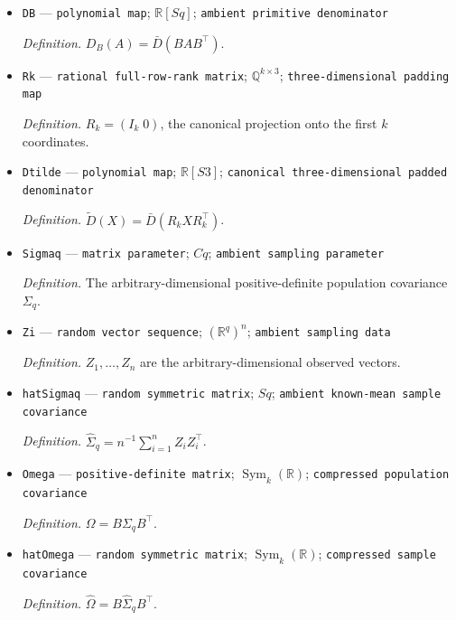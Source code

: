 \documentclass{article}
\begin{document}
\begin{itemize}
  \par\smallskip\noindent\emph{Definition.} \texttt{The nonzero,\allowbreak{} nonconstant homogeneous polynomial supplied on the compressed symmetric space.}
  \item \texttt{DB} --- \texttt{polynomial map}; \(\mathbb R[Sq]\); \texttt{ambient primitive denominator}
  \par\smallskip\noindent\emph{Definition.} \(D_B(A)=\bar D(BAB^{\top})\).
  \item \texttt{Rk} --- \texttt{rational full-\allowbreak{}row-\allowbreak{}rank matrix}; \(\mathbb Q^{k\times3}\); \texttt{three-\allowbreak{}dimensional padding map}
  \par\smallskip\noindent\emph{Definition.} \(R_k=(I_k\;0)\), the canonical projection onto the first \(k\) coordinates.
  \item \texttt{Dtilde} --- \texttt{polynomial map}; \(\mathbb R[S3]\); \texttt{canonical three-\allowbreak{}dimensional padded denominator}
  \par\smallskip\noindent\emph{Definition.} \(\widetilde D(X)=\bar D(R_kXR_k^{\top})\).
  \item \texttt{Sigmaq} --- \texttt{matrix parameter}; \(Cq\); \texttt{ambient sampling parameter}
  \par\smallskip\noindent\emph{Definition.} The arbitrary-dimensional positive-definite population covariance \(\Sigma_q\).
  \item \texttt{Zi} --- \texttt{random vector sequence}; \((\mathbb R^q)^n\); \texttt{ambient sampling data}
  \par\smallskip\noindent\emph{Definition.} \(Z_1,\ldots,Z_n\) are the arbitrary-dimensional observed vectors.
  \item \texttt{hatSigmaq} --- \texttt{random symmetric matrix}; \(Sq\); \texttt{ambient known-\allowbreak{}mean sample covariance}
  \par\smallskip\noindent\emph{Definition.} \(\widehat\Sigma_q=n^{-1}\sum_{i=1}^{n}Z_iZ_i^{\top}\).
  \item \texttt{Omega} --- \texttt{positive-\allowbreak{}definite matrix}; \(\operatorname{Sym}_{k}(\mathbb R)\); \texttt{compressed population covariance}
  \par\smallskip\noindent\emph{Definition.} \(\Omega=B\Sigma_qB^{\top}\).
  \item \texttt{hatOmega} --- \texttt{random symmetric matrix}; \(\operatorname{Sym}_{k}(\mathbb R)\); \texttt{compressed sample covariance}
  \par\smallskip\noindent\emph{Definition.} \(\widehat\Omega=B\widehat\Sigma_qB^{\top}\).

\end{itemize}
\end{document}
